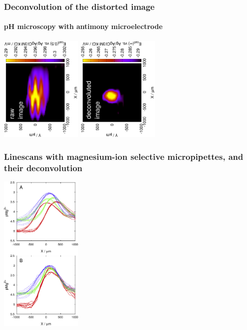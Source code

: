 \documentclass{beamer}
\begin{document}
\begin{frame}
	\frametitle{Deconvolution of the distorted image}
	\framesubtitle{pH microscopy with antimony microelectrode}
	\includegraphics[width=0.3\textwidth, angle=-90]{13121313.eps}
	\includegraphics[width=0.3\textwidth, angle=-90]{13121313_deconvoluted.eps}\\
\end{frame}




\begin{frame}
\begin{center}
\frametitle{Linescans with magnesium-ion selective micropipettes, and their deconvolution}
\includegraphics[width=0.3\textwidth]{mg.pdf}
\end{center}
\end{frame}
\end{document}
